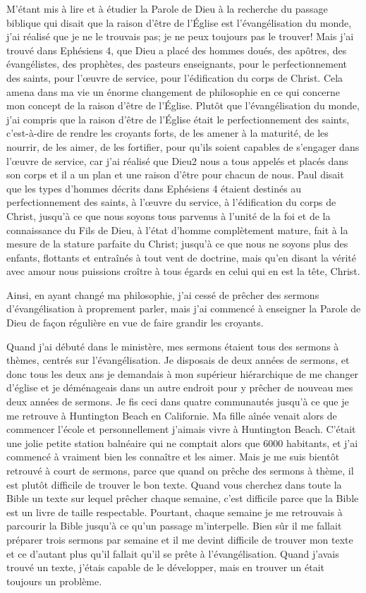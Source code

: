 M'étant mis à lire et à étudier la Parole de Dieu à la recherche du passage biblique qui disait que la raison d'être de
l'Église est l’évangélisation du monde, j'ai réalisé que je ne le trouvais pas; je ne peux toujours pas le trouver! Mais
j’ai trouvé dans Ephésiens 4, que Dieu a placé des hommes doués, des apôtres, des évangélistes, des prophètes, des
pasteurs enseignants, pour le perfectionnement des saints, pour l’œuvre de service, pour l’édification du corps de
Christ. Cela amena dans ma vie un énorme changement de philosophie en ce qui concerne mon concept de la raison
d'être de l’Église. Plutôt que l'évangélisation du monde, j'ai compris que la raison d'être de l'Église était le
perfectionnement des saints, c'est-à-dire de rendre les croyants forts, de les amener à la maturité, de les nourrir, de
les aimer, de les fortifier, pour qu’ils soient capables de s’engager dans l’œuvre de service, car j'ai réalisé que Dieu2
nous a tous appelés et placés dans son corps et il a un plan et une raison d'être pour chacun de nous. Paul disait
que les types d’hommes décrits dans Ephésiens 4 étaient destinés au perfectionnement des saints, à l'œuvre du
service, à l'édification du corps de Christ, jusqu’à ce que nous soyons tous parvenus à l’unité de la foi et de la
connaissance du Fils de Dieu, à l’état d’homme complètement mature, fait à la mesure de la stature parfaite du
Christ; jusqu’à ce que nous ne soyons plus des enfants, flottants et entraînés à tout vent de doctrine, mais qu’en
disant la vérité avec amour nous puissions croître à tous égards en celui qui en est la tête, Christ.

Ainsi, en ayant changé ma philosophie, j’ai cessé de prêcher des sermons d'évangélisation à proprement parler, mais
j’ai commencé à enseigner la Parole de Dieu de façon régulière en vue de faire grandir les croyants.

Quand j’ai débuté dans le ministère, mes sermons étaient tous des sermons à thèmes, centrés sur l’évangélisation. Je
disposais de deux années de sermons, et donc tous les deux ans je demandais à mon supérieur hiérarchique de me
changer d’église et je déménageais dans un autre endroit pour y prêcher de nouveau mes deux années de sermons.
Je fis ceci dans quatre communautés jusqu’à ce que je me retrouve à Huntington Beach en Californie. Ma fille aînée
venait alors de commencer l’école et personnellement j’aimais vivre à Huntington Beach. C’était une jolie petite station
balnéaire qui ne comptait alors que 6000 habitants, et j'ai commencé à vraiment bien les connaître et les aimer. Mais
je me suis bientôt retrouvé à court de sermons, parce que quand on prêche des sermons à thème, il est plutôt difficile
de trouver le bon texte. Quand vous cherchez dans toute la Bible un texte sur lequel prêcher chaque semaine, c’est
difficile parce que la Bible est un livre de taille respectable. Pourtant, chaque semaine je me retrouvais à parcourir la
Bible jusqu’à ce qu'un passage m’interpelle. Bien sûr il me fallait préparer trois sermons par semaine et il me devint
difficile de trouver mon texte et ce d’autant plus qu’il fallait qu’il se prête à l’évangélisation. Quand j’avais trouvé un
texte, j’étais capable de le développer, mais en trouver un était toujours un problème.

